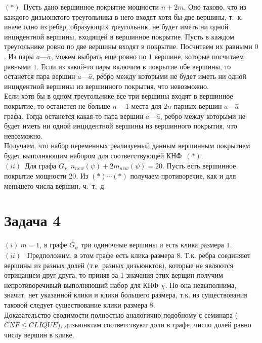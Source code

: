 \documentclass[a4paper,12pt]{article} %
\begin{document}
$(*)$~Пусть дано вершинное покрытие мощности $n+2m$. Оно таково, что из каждого дизьюнктого треугольника в него входят хотя бы две вершины, т.~к. иначе одно из ребер, образующих треугольник, не будет иметь ни одной инцидентной вершины, входящей в вершинное покрытие. Пусть в каждом треугольнике ровно по две вершины входят в покрытие. Посчитаем их равными $0$. Из пары $a\text{---}\overset{-}a$, можем выбрать еще ровно по $1$ вершине, которые посчитаем равными $1$. Если из какой-то пары включим в покрытие обе вершины, то останется пара вершин $a\text{---}\overset{-}a$, ребро между которыми не будет иметь ни одной инцидентной вершины из вершинного покрытия, что невозможно.\\ 
 
Если хотя бы в одном треугольнике все три вершины входят в вершинное покрытие, то останется не больше $n - 1$ места для $2n$ парных вершин $a\text{---}\overset{-}a$ графа. Тогда останется какая-то пара вершин $a\text{---}\overset{-}a$, ребро между которыми не будет иметь ни одной инцидентной вершины из вершинного покрытия, что невозможно.\\
Получаем, что набор переменных реализуемый данным вершинным покрытием будет выполняющим набором для соответствующей КНФ~$(*)$.\\

\noindent$(ii)$~Для графа $G_{\chi}~~n_{new}(\psi)+2m_{new}(\psi) = 20$. Пусть есть вершинное покрытие мощности 20. Из $(*)\cdots(*)$ получаем противоречие, как и для меньшего числа вершин, ч.~т.~д.  

\section*{Задача 4}
$(i)~m = 1$, в графе $\tilde{G_{\psi}}$ три одиночные вершины и есть клика размера $1$.\\
$(ii)$~ Предположим, в этом графе есть клика размера  $8$. Т.к. ребра соединяют вершины из разных долей (т.е. разных дизьюнктов), которые не  являются отрицанием друг друга, то приняв за 1 значения этих верщин получим непротиворечивый выполняющий набор для КНФ $\chi$. Но она невыполнима, значит, нет указанной клики и клики большего размера, т.к. из существования таковой следует существование клики размера 8.\\

Доказательство сводимости полностью аналогично подобному с семинара ($ CNF \leq CLIQUE$), дизьюнктам соответствуют доли в графе, число долей равно числу вершин в клике.\\
\end{document}
